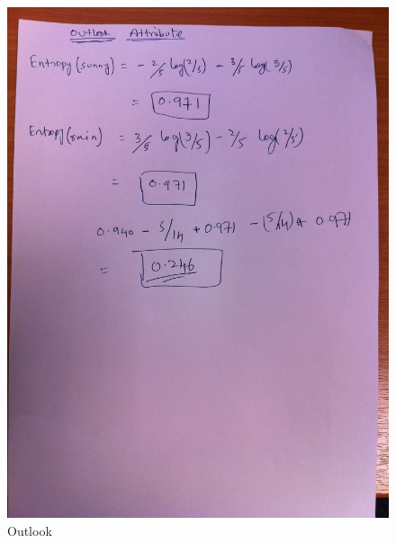 \documentclass{article}
\begin{document}
\begin{figure}[hbtp]
\centering
\includegraphics[scale=0.2]{IMG_0734.JPG}
\caption{Outlook}
\end{figure}
\end{document}
